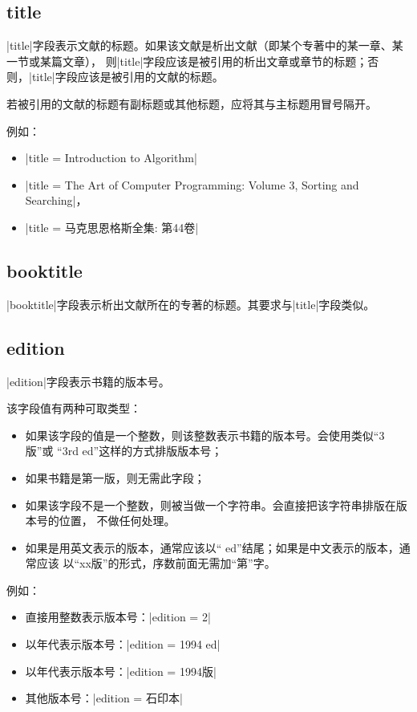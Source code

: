 \subsection{title}\label{subsec:title}

|title|字段表示文献的标题。如果该文献是析出文献（即某个专著中的某一章、某一节或某篇文章），
则|title|字段应该是被引用的析出文章或章节的标题；否则，|title|字段应该是被引用的文献的标题。

若被引用的文献的标题有副标题或其他标题，应将其与主标题用冒号隔开。

例如：
\begin{itemize}
\item |title = {Introduction to Algorithm}|
\item |title = {The Art of Computer Programming: Volume 3, Sorting and Searching}|，
\item |title = {马克思恩格斯全集: 第44卷}|
\end{itemize}

\subsection{booktitle}\label{subsec:booktitle}

|booktitle|字段表示析出文献所在的专著的标题。其要求与|title|字段类似。

\subsection{edition}\label{subsec:edition}

|edition|字段表示书籍的版本号。

该字段值有两种可取类型：
\begin{itemize}
\item 如果该字段的值是一个整数，则该整数表示书籍的版本号。{\BibTeX}会使用类似``3版''或
``3rd ed''这样的方式排版版本号；
\item 如果书籍是第一版，则无需此字段；
\item 如果该字段不是一个整数，则被当做一个字符串。{\BibTeX}会直接把该字符串排版在版本号的位置，
不做任何处理。
\item 如果是用英文表示的版本，通常应该以`` ed''结尾；如果是中文表示的版本，通常应该
以``xx版''的形式，序数前面无需加``第''字。
\end{itemize}

例如：
\begin{itemize}
\item 直接用整数表示版本号：|edition = {2}|
\item 以年代表示版本号：|edition = {1994 ed}|
\item 以年代表示版本号：|edition = {1994版}|
\item 其他版本号：|edition = {石印本}|
\end{itemize}


